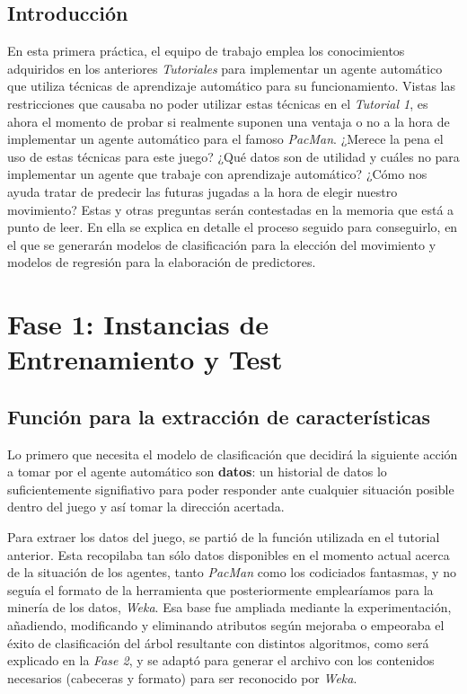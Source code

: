 \documentclass[12pt]{article}
\begin{document}
\clearpage
\vspace*{\fill}
\begin{center}
    \begin{minipage}{\textwidth}
        \begin{center}
            \section*{Introducción}
            En esta primera práctica, el equipo de trabajo emplea los conocimientos adquiridos en los anteriores \emph{Tutoriales} para implementar un agente automático que utiliza técnicas de aprendizaje automático para su funcionamiento. Vistas las restricciones que causaba no poder utilizar estas técnicas en el \emph{Tutorial 1}, es ahora el momento de probar si realmente suponen una ventaja o no a la hora de implementar un agente automático para el famoso \emph{PacMan}. ¿Merece la pena el uso de estas técnicas para este juego? ¿Qué datos son de utilidad y cuáles no para implementar un agente que trabaje con aprendizaje automático? ¿Cómo nos ayuda tratar de predecir las futuras jugadas a la hora de elegir nuestro movimiento? Estas y otras preguntas serán contestadas en la memoria que está a punto de leer. En ella se explica en detalle el proceso seguido para conseguirlo, en el que se generarán modelos de clasificación para la elección del movimiento y modelos de regresión para la elaboración de predictores.
        \end{center}
    \end{minipage}
\end{center}
\vfill

\newpage
\section{Fase 1: Instancias de Entrenamiento y Test}

\subsection{Función para la extracción de características}

Lo primero que necesita el modelo de clasificación que decidirá la siguiente acción a tomar por el agente automático son \textbf{datos}: un historial de datos lo suficientemente signifiativo para poder responder ante cualquier situación posible dentro del juego y así tomar la dirección acertada.

Para extraer los datos del juego, se partió de la función utilizada en el tutorial anterior. Esta recopilaba tan sólo datos disponibles en el momento actual acerca de la situación de los agentes, tanto \emph{PacMan} como los codiciados fantasmas, y no seguía el formato de la herramienta que posteriormente emplearíamos para la minería de los datos, \emph{Weka}. Esa base fue ampliada mediante la experimentación, añadiendo, modificando y eliminando atributos según mejoraba o empeoraba el éxito de clasificación del árbol resultante con distintos algoritmos, como será explicado en la \emph{Fase 2}, y se adaptó para generar el archivo con los contenidos necesarios (cabeceras y formato) para ser reconocido por \emph{Weka}.
\end{document}
